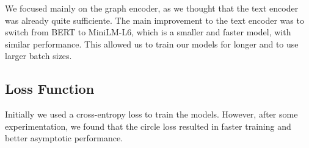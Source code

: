 \documentclass[switch, 12pt]{article}
\begin{document}
\begin{multicols}{2}
    \begin{table}[H]
        \begin{center}
        \end{center}
        \caption{Model evolution throughout the challenge.}
    \end{table}

    We focused mainly on the graph encoder, as we thought that the text encoder was already quite sufficiente. The main improvement to the text encoder was to switch from BERT to MiniLM-L6, which is a smaller and faster model, with similar performance. This allowed us to train our models for longer and to use larger batch sizes.

    \subsection{Loss Function}

    Initially we used a cross-entropy loss to train the models. However, after some experimentation, we found that the circle loss \cite{sun-2020} resulted in faster training and better asymptotic performance.


\end{multicols}
\end{document}

